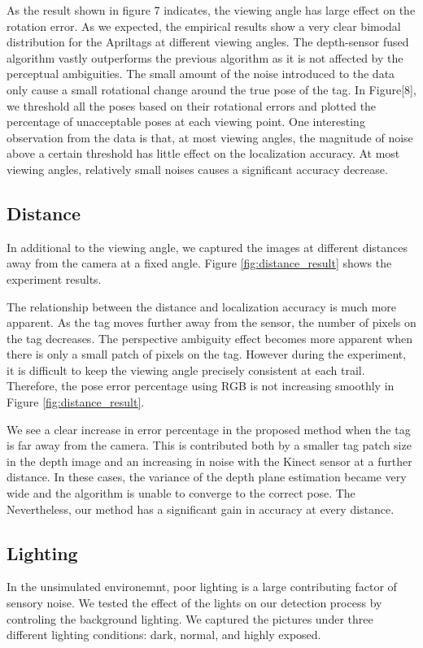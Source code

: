 As the result shown in figure 7 indicates, the viewing angle has large effect on the rotation error. As we expected, the empirical results show a very clear bimodal distribution for the Apriltags at different viewing angles. The depth-sensor fused algorithm vastly outperforms the previous algorithm as it is not affected by the perceptual ambiguities. The small amount of the noise introduced to the data only cause a small rotational change around the true pose of the tag. In Figure[8], we threshold all the poses based on their rotational errors and plotted the percentage of unacceptable poses at each viewing point. One interesting observation from the data is that, at most viewing angles, the magnitude of noise above a certain threshold has little effect on the localization accuracy. At most viewing angles, relatively small noises causes a significant accuracy decrease. 
\subsection{Distance}
In additional to the viewing angle, we captured the images at different distances away from the camera at a fixed angle. Figure \ref{fig:distance_result} shows the experiment results.

The relationship between the distance and localization accuracy is much more apparent. As the tag moves further away from the sensor, the number of pixels on the tag decreases. The perspective ambiguity effect becomes more apparent when there is only a small patch of pixels on the tag. However during the experiment, it is difficult to keep the viewing angle precisely consistent at each trail. Therefore, the pose error percentage using RGB is not increasing smoothly in Figure \ref{fig:distance_result}.

We see a clear increase in error percentage in the proposed method when the tag is far away from the camera. This is contributed both by a smaller tag patch size in the depth image and an increasing in noise with the Kinect sensor at a further distance. In these cases, the variance of the depth plane estimation became very wide and the algorithm is unable to converge to the correct pose. The Nevertheless, our method has a significant gain in accuracy at every distance.
\subsection{Lighting}
In the unsimulated environemnt, poor lighting is a large contributing factor of sensory noise. We tested the effect of the lights on our detection process by controling the background lighting. We captured the pictures under three different lighting conditions: dark, normal, and highly exposed. 

